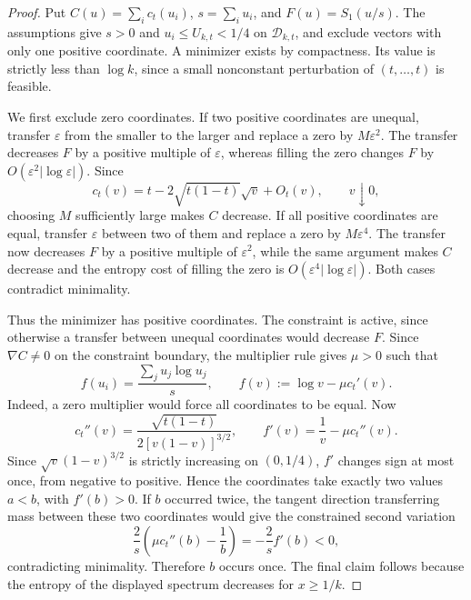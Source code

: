 \begin{proof}
Put $C(u)=\sum_i c_t(u_i)$, $s=\sum_i u_i$, and
$F(u)=S_1(u/s)$. The assumptions give $s>0$ and $u_i\leq U_{k,t}<1/4$
on $\mathscr D_{k,t}$, and exclude vectors with only one positive
coordinate. A minimizer exists by compactness. Its value is strictly
less than $\log k$, since a small nonconstant perturbation of
$(t,\ldots,t)$ is feasible.

We first exclude zero coordinates. If two positive coordinates are
unequal, transfer $\varepsilon$ from the smaller to the larger and
replace a zero by $M\varepsilon^2$. The transfer decreases $F$ by a
positive multiple of $\varepsilon$, whereas filling the zero changes
$F$ by $O(\varepsilon^2|\log\varepsilon|)$. Since
\begin{equation}
 c_t(v)=t-2\sqrt{t(1-t)}\sqrt v+O_t(v),\qquad v\downarrow0,
\end{equation}
choosing $M$ sufficiently large makes $C$ decrease. If all positive
coordinates are equal, transfer $\varepsilon$ between two of them
and replace a zero by $M\varepsilon^4$. The transfer now decreases
$F$ by a positive multiple of $\varepsilon^2$, while the same
argument makes $C$ decrease and the entropy cost of filling the zero
is $O(\varepsilon^4|\log\varepsilon|)$. Both cases contradict
minimality.

Thus the minimizer has positive coordinates. The constraint is
active, since otherwise a transfer between unequal coordinates
would decrease $F$. Since $\nabla C\neq0$ on the constraint boundary, the multiplier rule
gives $\mu>0$ such that
\begin{equation}
 f(u_i)=\frac{\sum_j u_j\log u_j}{s},
 \qquad f(v):=\log v-\mu c_t'(v).
\end{equation}
Indeed, a zero multiplier would force all coordinates to be equal.
Now
\begin{equation}
 c_t''(v)=\frac{\sqrt{t(1-t)}}{2[v(1-v)]^{3/2}},
 \qquad
 f'(v)=\frac1v-\mu c_t''(v).
\end{equation}
Since $\sqrt v(1-v)^{3/2}$ is strictly increasing on $(0,1/4)$,
$f'$ changes sign at most once, from negative to positive.
Hence the coordinates take exactly two values $a<b$, with $f'(b)>0$.
If $b$ occurred twice, the tangent direction transferring mass
between these two coordinates would give the constrained second
variation
\begin{equation}
 \frac2s\left(\mu c_t''(b)-\frac1b\right)
 =-\frac2s f'(b)<0,
\end{equation}
contradicting minimality. Therefore $b$ occurs once. The final claim
follows because the entropy of the displayed spectrum decreases
for $x\geq1/k$.
\end{proof}

